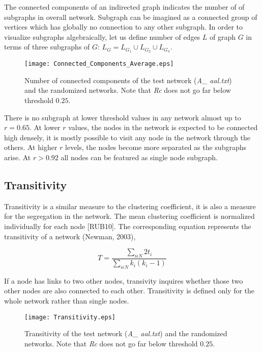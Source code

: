 \documentclass[12pt]{article}
\begin{document}
The connected components of an indirected graph indicates the number of of subgraphs in overall network. Subgraph can be imagined as a connected group of vertices which has globally no connection to any other subgraph. In order to visualize subgraphs algebraically, let us define number of edges $L$ of graph $G$ in terms of three subgraphs of $G$: $L_G = L_{G_1}\cup L_{G_2}\cup L_{G_3}$. 

\begin{figure}[h!]
	
	\centering
	\texttt{[image: Connected\_Components\_Average.eps]}
	\caption{Number of connected components of the test network (\textit{A\_ aal.txt}) and the randomized networks. Note that \textit{Rc} does not go far below threshold $0.25$.}
\end{figure}

There is no subgraph at lower threshold values in any network almost up to $r=0.65$. At lower $r$ values, the nodes in the network is expected to be connected high densely, it is mostly possible to visit any node in the network through the others. At higher $r$ levels, the nodes become more separated as the subgraphs arise. At $r>0.92$ all nodes can be featured as single node subgraph.  


\newpage


\subsection{Transitivity}
	Transitivity is a similar measure to the clustering coefficient, it is also a measure for the segregation in the network. The mean clustering coefficient is normalized individually for each node [RUB10]. The corresponding equation represents the transitivity of a network (Newman, 2003),
	
\begin{equation}
 T = \frac{\sum\limits_{i \epsilon N} 2 t_i}{\sum\limits_{i \epsilon N}k_i (k_i - 1)}
\end{equation}	

If a node has links to two other nodes, transivity inquires whether those two other nodes are also connected to each other. Transitivity is defined only for the whole network rather than single nodes. 

\begin{figure}[h!]
	
	\centering
	\texttt{[image: Transitivity.eps]}
	\caption{Transitivity of the test network (\textit{A\_ aal.txt}) and the randomized networks. Note that \textit{Rc} does not go far below threshold $0.25$.}
\end{figure}
\end{document}
